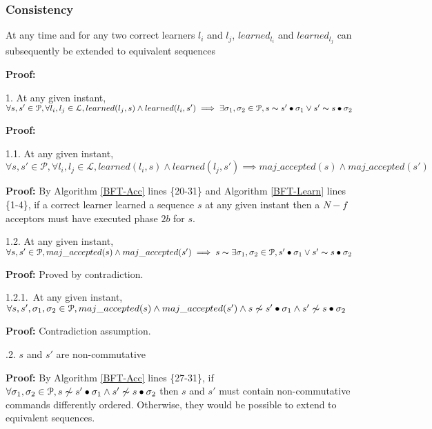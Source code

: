 \subsubsection{Consistency}
\begin{theorem}At any time and for any two correct learners $l_i$ and $l_j$, $learned_{l_i}$ and $learned_{l_j}$ can subsequently be extended to equivalent sequences \par
\end{theorem} 
\textbf{Proof:} \par
\parbox{\linewidth}{1. At any given instant, $\forall s,s' \in \mathcal{P}, \forall l_i,l_j \in \mathcal{L}, learned(l_j,s) \land learned(l_i,s') \implies \exists \sigma_1,\sigma_2 \in \mathcal{P}, s \thicksim s' \bullet \sigma_1 \lor s' \thicksim s \bullet \sigma_2$}  \par
\indent\indent\textbf{Proof:} \par
\indent\indent\indent\parbox{\linewidth-\algorithmicindent*3}{1.1. At any given instant, $\forall s,s' \in \mathcal{P}, \forall l_i,l_j \in \mathcal{L}, learned(l_i,s) \land learned(l_j,s') \implies maj\_accepted(s) \land maj\_accepted(s')$} \par
\indent\indent\indent\indent\parbox{\linewidth-\algorithmicindent*4}{\textbf{Proof:} By Algorithm \ref{BFT-Acc} lines \{20-31\} and Algorithm \ref{BFT-Learn} lines \{1-4\}, if a correct learner learned a sequence $s$ at any given instant then a $N-f$ acceptors must have executed phase $2b$ for $s$.}\par
\indent\indent\indent\parbox{\linewidth-\algorithmicindent*3}{1.2. At any given instant, $\forall s,s' \in \mathcal{P}, maj\_accepted(s) \land maj\_accepted(s') \implies s \thicksim \exists \sigma_1,\sigma_2 \in \mathcal{P}, s' \bullet \sigma_1 \lor s' \thicksim s \bullet \sigma_2$}\par
\indent\indent\indent\indent\textbf{Proof:} Proved by contradiction.\par
\indent\indent\indent\indent\indent\parbox{\linewidth-\algorithmicindent*5}{1.2.1.~At any given instant, $\forall s,s',\sigma_1,\sigma_2 \in \mathcal{P}, maj\_accepted(s) \land maj\_accepted(s') \wedge s \not\thicksim s' \bullet \sigma_1 \land s' \not\thicksim s \bullet \sigma_2$} \par
\indent\indent\indent\indent\indent\indent\textbf{Proof:} Contradiction assumption.\par
\indent\indent\indent\indent{}.2. $s$ and $s'$ are non-commutative \par
\indent\indent\indent\indent\indent\indent\parbox{\linewidth-\algorithmicindent*6}{\textbf{Proof:} By Algorithm \ref{BFT-Acc} lines \{27-31\}, if $\forall \sigma_1,\sigma_2 \in \mathcal{P}, s \not\thicksim s' \bullet \sigma_1 \land s' \not\thicksim s \bullet \sigma_2$ then $s$ and $s'$ must contain non-commutative commands differently ordered. Otherwise, they would be possible to extend to equivalent sequences.}\par
